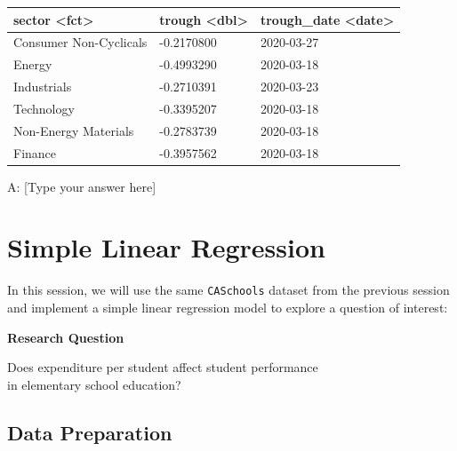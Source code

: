 \documentclass[
  12pt,
  letterpaper,
]{scrbook}
\theoremstyle{plain}
\theoremstyle{definition}
\theoremstyle{remark}
\begin{document}
\begin{longtable}[]{@{}lll@{}}
\toprule\noalign{}
sector \textless fct\textgreater{} & trough \textless dbl\textgreater{}
& trough\_date \textless date\textgreater{} \\
\midrule\noalign{}
\endhead
\bottomrule\noalign{}
\endlastfoot
Consumer Non-Cyclicals & -0.2170800 & 2020-03-27 \\
Energy & -0.4993290 & 2020-03-18 \\
Industrials & -0.2710391 & 2020-03-23 \\
Technology & -0.3395207 & 2020-03-18 \\
Non-Energy Materials & -0.2783739 & 2020-03-18 \\
Finance & -0.3957562 & 2020-03-18 \\
\end{longtable}

A: {[}Type your answer here{]}

\chapter{Simple Linear Regression}\label{simple-linear-regression}

In this session, we will use the same \texttt{CASchools} dataset from
the previous session and implement a simple linear regression model to
explore a question of interest:

\begin{tcolorbox}[enhanced jigsaw, bottomrule=.15mm, colframe=quarto-callout-important-color-frame, toprule=.15mm, arc=.35mm, opacityback=0, breakable, rightrule=.15mm, left=2mm, leftrule=.75mm, colback=white]

\vspace{-3mm}\textbf{Research Question}\vspace{3mm}

Does expenditure per student affect student performance\\
in elementary school education?

\end{tcolorbox}

\section{Data Preparation}\label{data-preparation}
\end{document}
